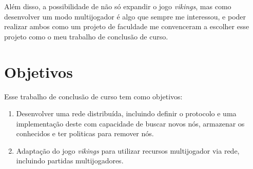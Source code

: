 Além disso, a possibilidade de não só expandir o jogo \textit{vikings}, mas como
desenvolver um modo multijogador é algo que sempre me interessou, e poder
realizar ambos como um projeto de faculdade me convenceram a escolher esse
projeto como o meu trabalho de conclusão de curso.

\section{Objetivos}
\label{sec:intr:objetivos}

Esse trabalho de conclusão de curso tem como objetivos:

\begin{enumerate}
  \item Desenvolver uma rede distribuída, incluindo definir o protocolo e uma implementação deste com capacidade de 
    buscar novos nós, armazenar os conhecidos e ter politicas para remover nós.
    
  \item Adaptação do jogo \textit{vikings} para utilizar recursos multijogador via rede, incluindo partidas
    multijogadores.
\end{enumerate}






